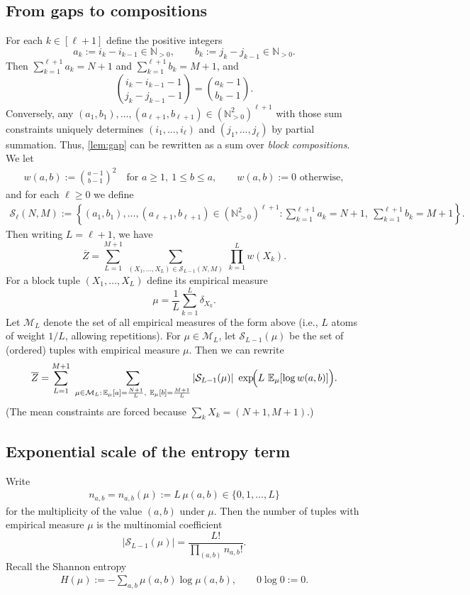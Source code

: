 \documentclass[11pt]{amsart}
\numberwithin{equation}{section}
\numberwithin{equation}{section}
\newcommand{\1}{\mathbbm{1}}
\newcommand{\calS}{\mathcal{S}}
\newcommand{\E}{\mathbb{E}}
\newcommand{\N}{\mathbb{N}}
\theoremstyle{definition}
\begin{document}
\subsection{From gaps to compositions}
For each $k\in[\ell+1]$ define the positive integers
\[
a_k:=i_k-i_{k-1}\in\N_{>0},\qquad b_k:=j_k-j_{k-1}\in\N_{>0}.
\]
Then $\sum_{k=1}^{\ell+1}a_k=N+1$ and $\sum_{k=1}^{\ell+1}b_k=M+1$, and
\[
\binom{i_k-i_{k-1}-1}{j_k-j_{k-1}-1}=\binom{a_k-1}{b_k-1}.
\]
Conversely, any $(a_1,b_1),\dots,(a_{\ell+1},b_{\ell+1})\in(\N_{>0}^2)^{\ell+1}$ with those sum constraints
uniquely determines $(i_1,\dots,i_\ell)$ and $(j_1,\dots,j_\ell)$ by partial summation.
Thus, \cref{lem:gap} can be rewritten as a sum over \emph{block compositions}. We let
\begin{align*}
    w(a,b):=\binom{a-1}{b-1}^2\quad\text{for }a\ge 1,\ 1\le b\le a, \qquad w(a,b):=0 \text{ otherwise},
\end{align*}
and for each $\ell \ge 0$ we define
\begin{align*}
    \mathcal{S}_{\ell}(N,M) := \left\{(a_1,b_1),\dots,(a_{\ell+1},b_{\ell+1})\in(\N_{>0}^2)^{\ell+1}: \sum_{k=1}^{\ell+1}a_k=N+1,\ \sum_{k=1}^{\ell+1}b_k=M+1 \right\}.
\end{align*}
Then writing $L=\ell+1$, we have
\begin{equation}\label{eq:composition-sum}
\overline{Z}
=\sum_{L=1}^{M+1} \ \sum_{(X_1,\dots,X_L)\in \mathcal{S}_{L-1}(N,M)}\ \prod_{k=1}^{L} w(X_k).
\end{equation}
For a block tuple $(X_1,\dots,X_L)$ define its empirical measure
\[
\mu = \frac{1}{L}\sum_{k=1}^L \delta_{X_k}.
\]
Let $\mathcal{M}_L$ denote the set of all empirical measures of the form above (i.e., $L$ atoms of weight $1/L$,
allowing repetitions). For $\mu\in\mathcal{M}_L$, let $\calS_{L-1}(\mu)$ be the set of (ordered) tuples
with empirical measure $\mu$. Then we can rewrite
\begin{equation}\label{eq:Z-by-type}
\overline{Z}
=\sum_{L=1}^{M+1}\ \sum_{\mu\in\mathcal{M}_L:\, \E_\mu[a]=\frac{N+1}{L},\ \E_\mu[b]=\frac{M+1}{L}}
|\calS_{L-1}(\mu)|\ \exp\!\Bigl(L\ \E_{\mu}[\log w(a,b)]\Bigr).
\end{equation}
(The mean constraints are forced because $\sum_k X_k=(N+1,M+1)$.)

\subsection{Exponential scale of the entropy term}

Write 
\begin{align*}
    n_{a,b} = n_{a,b}(\mu) := L\,\mu(a,b)\in\{0,1,\dots,L\}
\end{align*}
for the multiplicity of the value $(a,b)$ under $\mu$.
Then the number of tuples with empirical measure $\mu$ is the multinomial coefficient
\begin{equation}\label{eq:multinomial}
|\calS_{L-1}(\mu)|
=\frac{L!}{\prod_{(a,b)} n_{a,b}!}.
\end{equation}
Recall the Shannon entropy
\begin{align*}
    H(\mu) := -\sum_{a,b}\mu(a,b)\log\mu(a,b), \qquad 0\log0 := 0.
\end{align*}
\end{document}
